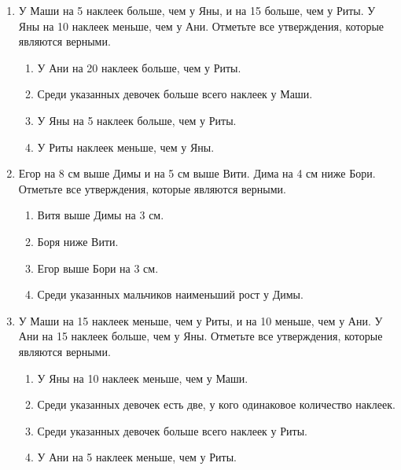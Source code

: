 \documentclass[a4paper,12pt]{article}
\newcommand{\taskspace}{\par\vspace{0.42cm}}
\begin{document}
\begin{enumerate}[resume]
\taskspace

\item У Маши на 5 наклеек больше, чем у Яны, и на 15 больше, чем у Риты. У Яны на 10 наклеек меньше, чем у Ани. Отметьте все утверждения, которые являются верными.
\begin{enumerate}[label=\arabic*),leftmargin=8mm,itemsep=0.25em,topsep=0.35em]
\item У Ани на 20 наклеек больше, чем у Риты.
\item Среди указанных девочек больше всего наклеек у Маши.
\item У Яны на 5 наклеек больше, чем у Риты.
\item У Риты наклеек меньше, чем у Яны.
\end{enumerate}

\taskspace

\item Егор на 8 см выше Димы и на 5 см выше Вити. Дима на 4 см ниже Бори. Отметьте все утверждения, которые являются верными.
\begin{enumerate}[label=\arabic*),leftmargin=8mm,itemsep=0.25em,topsep=0.35em]
\item Витя выше Димы на 3 см.
\item Боря ниже Вити.
\item Егор выше Бори на 3 см.
\item Среди указанных мальчиков наименьший рост у Димы.
\end{enumerate}

\taskspace

\item У Маши на 15 наклеек меньше, чем у Риты, и на 10 меньше, чем у Ани. У Ани на 15 наклеек больше, чем у Яны. Отметьте все утверждения, которые являются верными.
\begin{enumerate}[label=\arabic*),leftmargin=8mm,itemsep=0.25em,topsep=0.35em]
\item У Яны на 10 наклеек меньше, чем у Маши.
\item Среди указанных девочек есть две, у кого одинаковое количество наклеек.
\item Среди указанных девочек больше всего наклеек у Риты.
\item У Ани на 5 наклеек меньше, чем у Риты.
\end{enumerate}

\taskspace


\end{enumerate}
\end{document}
